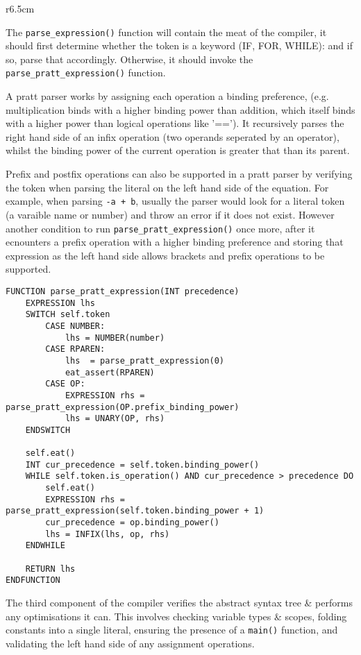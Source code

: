 \begin{wrapfigure}[24]{r}{6.5cm}
\end{wrapfigure}

The \texttt{parse\_expression()} function will contain the meat of the compiler, it should first determine whether the token is a keyword (IF, FOR, WHILE): and if so, parse that accordingly. Otherwise, it should invoke the \texttt{parse\_pratt\_expression()} function. 

A pratt parser works by assigning each operation a binding preference, (e.g. multiplication binds with a higher binding power than addition, which itself binds with a higher power than logical operations like '=='). It recursively parses the right hand side of an infix operation (two operands seperated by an operator), whilst the binding power of the current operation is greater that than its parent. 

Prefix and postfix operations can also be supported in a pratt parser by verifying the token when parsing the literal on the left hand side of the equation. For example, when parsing \texttt{-a + b}, usually the parser would look for a literal token (a varaible name or number) and throw an error if it does not exist. However another condition to run \texttt{parse\_pratt\_expression()} once more, after it ecnounters a prefix operation with a higher binding preference and storing that expression as the left hand side allows brackets and prefix operations to be supported.

\begin{lstlisting}
FUNCTION parse_pratt_expression(INT precedence)
    EXPRESSION lhs
    SWITCH self.token 
        CASE NUMBER:
            lhs = NUMBER(number)
        CASE RPAREN:
            lhs  = parse_pratt_expression(0)
            eat_assert(RPAREN)
        CASE OP:
            EXPRESSION rhs = parse_pratt_expression(OP.prefix_binding_power)
            lhs = UNARY(OP, rhs)
    ENDSWITCH

    self.eat()
    INT cur_precedence = self.token.binding_power()
    WHILE self.token.is_operation() AND cur_precedence > precedence DO 
        self.eat()
        EXPRESSION rhs = parse_pratt_expression(self.token.binding_power + 1)
        cur_precedence = op.binding_power()
        lhs = INFIX(lhs, op, rhs)
    ENDWHILE

    RETURN lhs
ENDFUNCTION
\end{lstlisting}

The third component of the compiler verifies the abstract syntax tree \& performs any optimisations it can. This involves checking variable types \& scopes, folding constants into a single literal, ensuring the presence of a \texttt{main()} function, and validating the left hand side of any assignment operations. 

